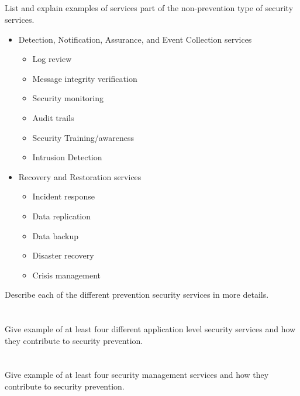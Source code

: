 \begin{questions}
\begin{parts}
  \part{} List and explain examples of services part of the non-prevention type of security services.
    \begin{solution}
      \begin{itemize}[noitemsep]
      \item Detection, Notification, Assurance, and Event Collection services
        \begin{itemize}[noitemsep]
        \item Log review
        \item Message integrity verification
        \item Security monitoring
        \item Audit trails
        \item Security Training/awareness
        \item Intrusion Detection
        \end{itemize}
      \item Recovery and Restoration services
        \begin{itemize}[noitemsep]
        \item Incident response
        \item Data replication
        \item Data backup
        \item Disaster recovery
        \item Crisis management
        \end{itemize}
      \end{itemize}
    \end{solution}
  \end{parts}

\question{} Describe each of the different prevention security services in more details.
  \begin{parts}
  \part{} Give example of at least four different application level security services and how they contribute to security prevention.
  \part{} Give example of at least four security management services and how they contribute to security prevention.

\end{parts}
\end{questions}
